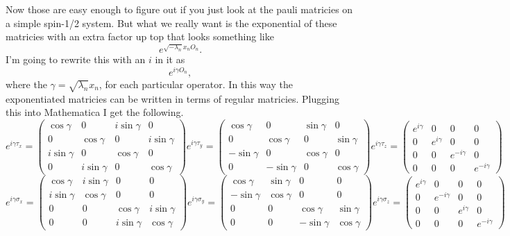 Now those are easy enough to figure out if you just look at the pauli matricies on a simple spin-1/2 system. But what we really want is the exponential of these matricies with an extra factor up top that looks something like
\begin{equation}
   e^{\sqrt{-\lambda_n}x_nO_n}.
\end{equation}
I'm going to rewrite this with an $i$ in it as
\begin{equation}
   e^{i\gamma O_n},
\end{equation}
where the $\gamma=\sqrt{\lambda_n}x_n$, for each particular operator. In this way the exponentiated matricies can be written in terms of regular matricies. Plugging this into Mathematica I get the following.
\footnotesize
\begin{equation*}
e^{i\gamma\tau_x}=
\begin{pmatrix}
    \cos\gamma & 0 & i\sin\gamma & 0 \\
    0 & \cos\gamma & 0 & i\sin\gamma \\
    i\sin\gamma & 0 & \cos\gamma & 0 \\
    0 & i\sin\gamma & 0 & \cos\gamma
\end{pmatrix}
e^{i\gamma\tau_y}=
\begin{pmatrix}
    \cos\gamma & 0 & \sin\gamma & 0 \\
    0 & \cos\gamma & 0 & \sin\gamma \\
    -\sin\gamma & 0 & \cos\gamma & 0 \\
    0 & -\sin\gamma & 0 & \cos\gamma
\end{pmatrix}
e^{i\gamma\tau_z}=
\begin{pmatrix}
    e^{i\gamma} & 0 & 0 & 0 \\
    0 & e^{i\gamma} & 0 & 0 \\
    0 & 0 & e^{-i\gamma} & 0 \\
    0 & 0 & 0 & e^{-i\gamma}
\end{pmatrix}
\end{equation*}
\begin{equation*}
e^{i\gamma\sigma_x}=
\begin{pmatrix}
    \cos\gamma & i\sin\gamma & 0 & 0 \\
    i\sin\gamma & \cos\gamma & 0 & 0 \\
    0 & 0 & \cos\gamma & i\sin\gamma \\
    0 & 0 & i\sin\gamma & \cos\gamma
\end{pmatrix}
e^{i\gamma\sigma_y}=
\begin{pmatrix}
    \cos\gamma & \sin\gamma & 0 & 0 \\
    -\sin\gamma & \cos\gamma & 0 & 0 \\
    0 & 0 & \cos\gamma & \sin\gamma \\
    0 & 0 & -\sin\gamma & \cos\gamma
\end{pmatrix}
e^{i\gamma\sigma_z}=
\begin{pmatrix}
    e^{i\gamma} & 0 & 0 & 0 \\
    0 & e^{-i\gamma} & 0 & 0 \\
    0 & 0 & e^{i\gamma} & 0 \\
    0 & 0 & 0 & e^{-i\gamma}
\end{pmatrix}
\end{equation*}
